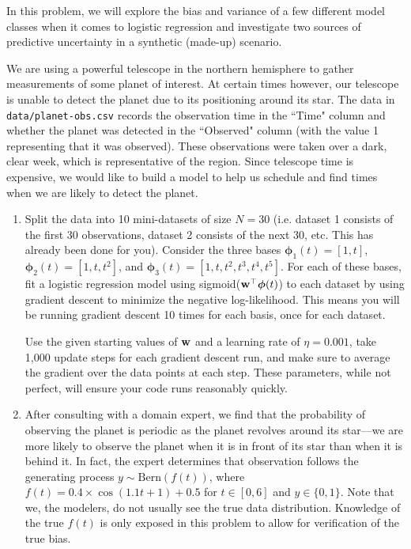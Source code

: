 \documentclass[submit]{../harvardml}
\begin{document}
\begin{problem}
In this problem, we will explore the bias and variance of a few
different model classes when it comes to logistic regression and
investigate two sources of predictive uncertainty in a synthetic
(made-up) scenario.

We are using a powerful telescope in the northern hemisphere to gather
measurements of some planet of interest. At certain times however, our
telescope is unable to detect the planet due to its positioning around
its star.  The data in \verb|data/planet-obs.csv| records the
observation time in the ``Time" column and whether the planet was
detected in the ``Observed" column (with the value 1 representing that
it was observed).  These observations were taken over a dark, clear
week, which is representative of the region.  Since telescope time is
expensive, we would like to build a model to help us schedule and find
times when we are likely to detect the planet.

\begin{enumerate}
  \item Split the data into 10 mini-datasets of size $N = 30$ (i.e. dataset 1 consists of the first 30 observations, dataset 2 consists of the next 30, etc. This has already been done for you). Consider the three bases $\boldsymbol\phi_1(t) = [1, t]$, $\boldsymbol\phi_2(t) = [1,
          t, t^2]$, and $\boldsymbol\phi_3(t) = [1, t, t^2, t^3, t^4, t^5]$. For each of these bases, fit a logistic regression model using sigmoid($\mathbf{w}^\top \boldsymbol\phi(t)$) to each dataset by using gradient descent to
        minimize the negative log-likelihood.  This means you will be
        running gradient descent 10 times for each basis, once for each
        dataset.

        Use the given starting values of $\mathbf{w}$ and a learning rate of $\eta=0.001$, take 1,000 update
        steps for each gradient descent run, and make sure to average the
        gradient over the data points at each step. These parameters,
        while not perfect, will ensure your code runs reasonably quickly.

  \item After consulting with a domain expert, we find that the probability of observing the planet is periodic as the planet revolves around its star---we are more likely to observe the planet when it is in front of its star than when it is behind it. In fact, the expert determines that observation follows the generating process $y \sim \text{Bern}(f(t))$, where $f(t) = 0.4 \times \cos(1.1t + 1) + 0.5$ for $t \in [0, 6]$ and $y \in \{0,1\}$. Note that we, the modelers, do not usually see the true data distribution. Knowledge of the true $f(t)$ is only exposed in this problem to allow for verification of the true bias.


\end{enumerate}
\end{problem}
\end{document}
